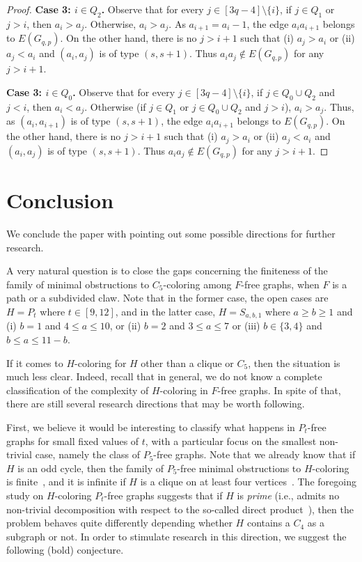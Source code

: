 \documentclass[11pt,a4paper]{article}
\theoremstyle{mystyle}
\begin{document}
\begin{proof}
\smallskip
\noindent\textbf{\boldmath Case 3: $i \in Q_2$.} Observe that for every $j \in [3q-4] \setminus \{i\}$, if $j \in Q_1$ or $j>i$, then $a_i > a_j$. Otherwise, $a_i>a_j$. As $a_{i+1}=a_i-1$, the edge $a_ia_{i+1}$ belongs to $E(G_{q,p})$. On the other hand, there is no $j >i+1$ such that (i) $a_j>a_i$ or (ii) $a_j<a_i$ and $(a_i,a_j)$ is of type $(s,s+1)$. Thus $a_ia_j \notin E(G_{q,p})$ for any $j >i+1$.

\smallskip
\noindent\textbf{\boldmath Case 3: $i \in Q_0$.}  Observe that for every $j \in [3q-4] \setminus \{i\}$, if $j \in Q_0 \cup Q_2$ and $j <i$, then $a_i < a_j$. Otherwise (if $j \in Q_1$ or $j \in Q_0 \cup Q_2$ and $j>i$), $a_i>a_j$. Thus, as $(a_i,a_{i+1})$ is of type $(s,s+1)$, the edge $a_ia_{i+1}$ belongs to $E(G_{q,p})$. On the other hand, there is no $j >i+1$ such that (i) $a_j>a_i$ or (ii) $a_j<a_i$ and $(a_i,a_j)$ is of type $(s,s+1)$. Thus $a_ia_j \notin E(G_{q,p})$ for any $j >i+1$.
\end{proof}


\section{Conclusion} 
We conclude the paper with pointing out some possible directions for further research.

A very natural question is to close the gaps concerning the finiteness of the family of minimal obstructions to $C_5$-coloring among $F$-free graphs, when $F$ is a path or a subdivided claw.
Note that in the former case, the open cases are $H = P_t$ where $t \in [9,12]$, and in the latter case, $H = S_{a,b,1}$ where $a \geq b \geq 1$ and (i) $b=1$ and $4 \leq a \leq 10$, or (ii) $b=2$ and $3 \leq a \leq 7$ or (iii) $b \in \{3,4\}$ and $b \leq a \leq 11-b$.

If it comes to $H$-coloring for $H$ other than a clique or $C_5$, then the situation is much less clear. Indeed, recall that in general, we do not know a complete classification of the complexity of $H$-coloring in $F$-free graphs. In spite of that, there are still several research directions that may be worth following.

First, we believe it would be interesting to classify what happens in $P_t$-free graphs for small fixed values of $t$, with a particular focus on the smallest non-trivial case, namely the class of $P_5$-free graphs. Note that we already know that if $H$ is an odd cycle, then the family of $P_5$-free minimal obstructions to $H$-coloring is finite~\cite{DBLP:journals/dam/KaminskiP19}, and it is infinite if $H$ is a clique on at least four vertices~\cite{DBLP:journals/dam/HoangMRSV15}. 
The foregoing study on $H$-coloring $P_t$-free graphs suggests that if $H$ is \emph{prime} (i.e., admits no non-trivial decomposition with respect to the so-called direct product~\cite{hammack2011handbook}), then the problem behaves quite differently depending whether $H$ contains a $C_4$ as a subgraph or not.
In order to stimulate research in this direction, we suggest the following (bold) conjecture.
\end{document}
